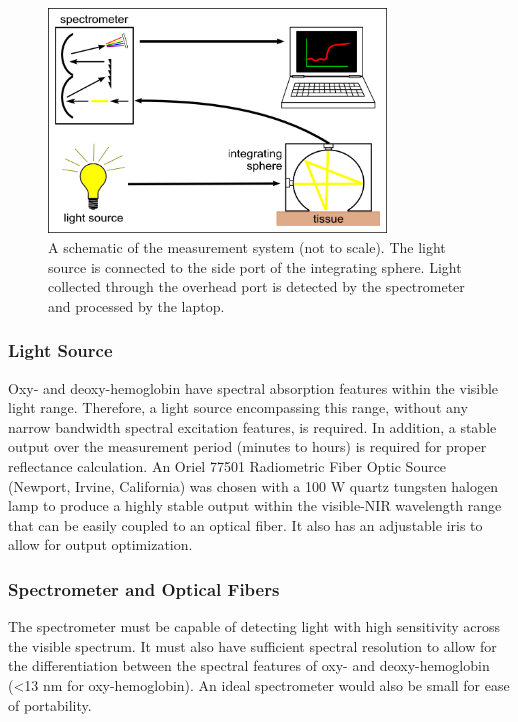 \begin{figure}
	\centering \includegraphics[width=0.8\textwidth]{figures/p1-sys_diagram.png}
	\caption[System schematic]{\label{fig:p1-sys_diagram}A schematic of the measurement system (not to scale). The light source is connected to the side port of the integrating sphere. Light collected through the overhead port is detected by the spectrometer and processed by the laptop.}
\end{figure}

\subsubsection{Light Source}
Oxy- and deoxy-hemoglobin have spectral absorption features within the visible light range.\cite{Young1997,Lister2012} Therefore, a light source encompassing this range, without any narrow bandwidth spectral excitation features, is required. In addition, a stable output over the measurement period (minutes to hours) is required for proper reflectance calculation. An Oriel 77501 Radiometric Fiber Optic Source (Newport, Irvine, California) was chosen with a 100 W quartz tungsten halogen lamp to produce a highly stable output within the visible-NIR wavelength range that can be easily coupled to an optical fiber. It also has an adjustable iris to allow for output optimization.

\subsubsection{Spectrometer and Optical Fibers}
The spectrometer must be capable of detecting light with high sensitivity across the visible spectrum. It must also have sufficient spectral resolution to allow for the differentiation between the spectral features of oxy- and deoxy-hemoglobin (<13 nm for oxy-hemoglobin). An ideal spectrometer would also be small for ease of portability.

